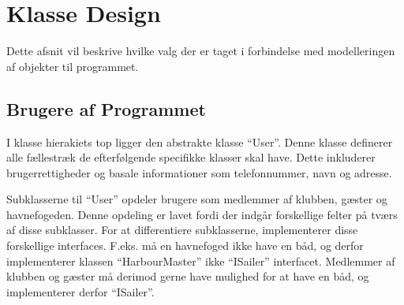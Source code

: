 \section{Klasse Design}
\label{sec:klasse_design}

Dette afsnit vil beskrive hvilke valg der er taget i forbindelse med modelleringen af objekter til programmet.

\subsection{Brugere af Programmet}
\label{sub:brugere_af_programmet}

I klasse hierakiets top ligger den abstrakte klasse \enquote{User}. Denne klasse definerer alle fællestræk de efterfølgende specifikke klasser skal have. Dette inkluderer brugerrettigheder og basale informationer som telefonnummer, navn og adresse.

Subklasserne til \enquote{User} opdeler brugere som medlemmer af klubben, gæster og havnefogeden. Denne opdeling er lavet fordi der indgår forskellige felter på tværs af disse subklasser. For at differentiere subklasserne, implementerer disse forskellige interfaces. F.eks. må en havnefoged ikke have en båd, og derfor implementerer klassen \enquote{HarbourMaster} ikke \enquote{ISailer} interfacet. Medlemmer af klubben og gæster må derimod gerne have mulighed for at have en båd, og implementerer derfor \enquote{ISailer}.

